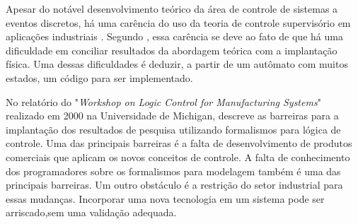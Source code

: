 







Apesar do not\'avel desenvolvimento te\'orico da \'area de controle de sistemas a eventos discretos, h\'a uma car\^encia do uso da teoria de controle supervis\'orio em aplica\c{c}\~oes industriais \cite{queiroz2002}. Segundo \cite{fabian}, essa car\^encia se deve ao fato de que h\'a uma dificuldade em conciliar resultados da abordagem te\'orica com a implanta\c{c}\~ao f\'isica. Uma dessas dificuldades \'e deduzir, a partir de um aut\^omato com muitos estados, um c\'odigo para ser implementado.

No relat\'orio do "\textit{Workshop on Logic Control for Manufacturing Systems}" \space realizado em 2000 na Universidade de Michigan, \cite{workshop2000} descreve as barreiras para a implanta\c{c}\~ao dos resultados de pesquisa utilizando formalismos para l\'ogica de controle. Uma das principais barreiras \'e a falta de desenvolvimento de produtos comerciais que aplicam os novos conceitos de controle. A falta de conhecimento dos programadores sobre os formalismos para modelagem tamb\'em \'e uma das principais barreiras. Um outro obst\'aculo \'e a restri\c{c}\~ao do setor industrial para essas mudan\c{c}as. Incorporar uma nova tecnologia em um sistema pode ser arriscado,sem uma valida\c{c}\~ao adequada.

